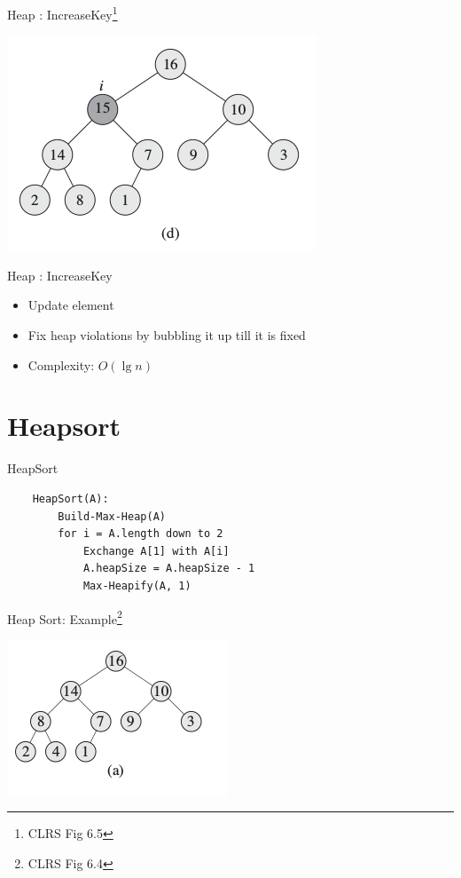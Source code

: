 \documentclass{beamer}
\begin{document}
\begin{frame}{Heap : IncreaseKey\footnote{CLRS Fig 6.5}}
    \begin{center}
        \includegraphics[scale=0.5]{heapIncreaseKey4.png}
    \end{center}
\end{frame}


\begin{frame}{Heap : IncreaseKey}
    \begin{itemize}
        \item Update element 
        \item Fix heap violations by bubbling it up till it is fixed
        \item Complexity: \pause $O(\lg n)$
    \end{itemize}
\end{frame}


\section{Heapsort}
\begin{frame}[fragile]{HeapSort}
    \begin{verbatim}
    HeapSort(A):
        Build-Max-Heap(A)
        for i = A.length down to 2
            Exchange A[1] with A[i]
            A.heapSize = A.heapSize - 1
            Max-Heapify(A, 1)
    \end{verbatim}
\end{frame}


\begin{frame}{Heap Sort: Example\footnote{CLRS Fig 6.4}}
    \begin{center}
        \includegraphics[scale=0.7]{heapSort1.png}
    \end{center}
\end{frame}
\end{document}
